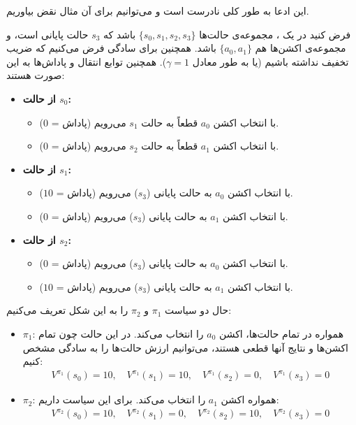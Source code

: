 \question{}

این ادعا به طور کلی نادرست است و می‌توانیم برای آن مثال نقض بیاوریم.

فرض کنید در یک ، مجموعه‌ی حالت‌ها $\{s_0, s_1, s_2, s_3\}$ باشد که $s_3$ حالت پایانی است، و مجموعه‌ی اکشن‌ها هم $\{a_0, a_1\}$ باشد. همچنین برای سادگی فرض می‌کنیم که ضریب تخفیف نداشته باشیم (یا به طور معادل $\gamma = 1$). همچنین توابع انتقال و پاداش‌ها به این صورت هستند:
\begin{itemize}
    \item \textbf{از حالت $s_0$:}
          \begin{itemize}
              \item با انتخاب اکشن $a_0$ قطعاً به حالت $s_1$ می‌رویم (پاداش = $0$).
              \item با انتخاب اکشن $a_1$ قطعاً به حالت $s_2$ می‌رویم (پاداش = $0$).
          \end{itemize}

    \item \textbf{از حالت $s_1$:}
          \begin{itemize}
              \item با انتخاب اکشن $a_0$ به حالت پایانی ($s_3$) می‌رویم (پاداش = $10$).
              \item با انتخاب اکشن $a_1$ به حالت پایانی ($s_3$) می‌رویم (پاداش = $0$).
          \end{itemize}

    \item \textbf{از حالت $s_2$:}
          \begin{itemize}
              \item با انتخاب اکشن $a_0$ به حالت پایانی ($s_3$) می‌رویم (پاداش = $0$).
              \item با انتخاب اکشن $a_1$ به حالت پایانی ($s_3$) می‌رویم (پاداش = $10$).
          \end{itemize}
\end{itemize}

حال دو سیاست $\pi_1$ و $\pi_2$ را به این شکل تعریف می‌کنیم:
\begin{itemize}
    \item $\pi_1$: همواره در تمام حالت‌ها، اکشن $a_0$ را انتخاب می‌کند. در این حالت چون تمام اکشن‌ها و نتایج آنها قطعی هستند، می‌توانیم ارزش حالت‌ها را به سادگی مشخص کنیم:
          \begin{align*}
              V^{\pi_1}(s_0) = 10, \quad V^{\pi_1}(s_1) = 10, \quad V^{\pi_1}(s_2) = 0, \quad V^{\pi_1}(s_3) = 0
          \end{align*}
    \item $\pi_2$: همواره اکشن $a_1$ را انتخاب می‌کند. برای این سیاست داریم:
          \begin{align*}
              V^{\pi_2}(s_0) = 10, \quad V^{\pi_2}(s_1) = 0, \quad V^{\pi_2}(s_2) = 10, \quad V^{\pi_2}(s_3) = 0
          \end{align*}
\end{itemize}

